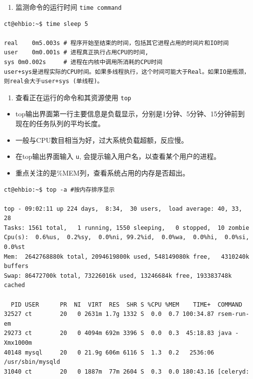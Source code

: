 \documentclass[]{article}
\providecommand{\tightlist}{%
  \setlength{\itemsep}{0pt}\setlength{\parskip}{0pt}}
\numberwithin{figure}{section}
\numberwithin{table}{section}
\begin{document}
\begin{enumerate}
\def\labelenumi{\arabic{enumi}.}
\tightlist
\item
  监测命令的运行时间 \texttt{time\ command}
\end{enumerate}

\begin{verbatim}
ct@ehbio:~$ time sleep 5

real	0m5.003s # 程序开始至结束的时间，包括其它进程占用的时间片和IO时间
user	0m0.001s # 进程真正执行占用CPU的时间, 
sys	0m0.002s     # 进程在内核中调用所消耗的CPU时间
user+sys是进程实际的CPU时间。如果多线程执行，这个时间可能大于Real。如果IO是瓶颈，则real会大于user+sys (单线程)。
\end{verbatim}

\begin{enumerate}
\def\labelenumi{\arabic{enumi}.}
\setcounter{enumi}{1}
\tightlist
\item
  查看正在运行的命令和其资源使用 \texttt{top}
\end{enumerate}

\begin{itemize}
\tightlist
\item
  top输出界面第一行主要信息是负载显示，分别是1分钟、5分钟、15分钟前到现在的任务队列的平均长度。
\item
  一般与CPU数目相当为好，过大系统负载超额，反应慢。
\item
  在top输出界面输入 \texttt{u}, 会提示输入用户名，以查看某个用户的进程。
\item
  重点关注的是\%MEM列，查看系统占用的内存是否超出。
\end{itemize}

\begin{verbatim}
ct@ehbio:~$ top -a #按内存排序显示

top - 09:02:11 up 224 days,  8:34,  30 users,  load average: 40, 33, 28
Tasks: 1561 total,   1 running, 1550 sleeping,   0 stopped,  10 zombie
Cpu(s):  0.6%us,  0.2%sy,  0.0%ni, 99.2%id,  0.0%wa,  0.0%hi,  0.0%si,  0.0%st
Mem:  2642768880k total, 2094619800k used, 548149080k free,   4310240k buffers
Swap: 86472700k total, 73226016k used, 13246684k free, 193383748k cached

  PID USER      PR  NI  VIRT  RES  SHR S %CPU %MEM    TIME+  COMMAND                                  
32527 ct        20   0 2631m 1.7g 1332 S  0.0  0.7 100:34.87 rsem-run-em 
29273 ct        20   0 4094m 692m 3396 S  0.0  0.3  45:18.83 java -Xmx1000m
40148 mysql     20   0 21.9g 606m 6116 S  1.3  0.2   2536:06 /usr/sbin/mysqld
31040 ct        20   0 1887m  77m 2604 S  0.3  0.0 180:43.16 [celeryd: 
\end{verbatim}
\end{document}
